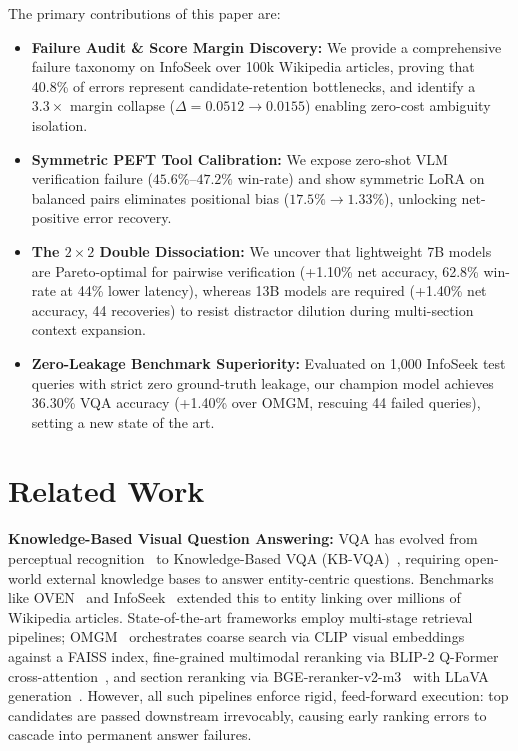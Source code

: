 \documentclass[conference]{IEEEtran}
\begin{document}
The primary contributions of this paper are:
\begin{itemize}
    \item \textbf{Failure Audit \& Score Margin Discovery:} We provide a comprehensive failure taxonomy on InfoSeek over 100k Wikipedia articles, proving that 40.8\% of errors represent candidate-retention bottlenecks, and identify a $3.3\times$ margin collapse ($\Delta = 0.0512 \to 0.0155$) enabling zero-cost ambiguity isolation.
    \item \textbf{Symmetric PEFT Tool Calibration:} We expose zero-shot VLM verification failure ($45.6\%$--$47.2\%$ win-rate) and show symmetric LoRA on balanced pairs eliminates positional bias ($17.5\% \to 1.33\%$), unlocking net-positive error recovery.
    \item \textbf{The \texorpdfstring{$2 \times 2$}{2x2} Double Dissociation:} We uncover that lightweight 7B models are Pareto-optimal for pairwise verification (+1.10\% net accuracy, 62.8\% win-rate at 44\% lower latency), whereas 13B models are required (+1.40\% net accuracy, 44 recoveries) to resist distractor dilution during multi-section context expansion.
    \item \textbf{Zero-Leakage Benchmark Superiority:} Evaluated on 1,000 InfoSeek test queries with strict zero ground-truth leakage, our champion model achieves 36.30\% VQA accuracy (+1.40\% over OMGM, rescuing 44 failed queries), setting a new state of the art.
\end{itemize}


\section{Related Work}

\textbf{Knowledge-Based Visual Question Answering:} VQA has evolved from perceptual recognition~\cite{vqa_v2} to Knowledge-Based VQA (KB-VQA)~\cite{okvqa, aokvqa}, requiring open-world external knowledge bases to answer entity-centric questions. Benchmarks like OVEN~\cite{oven} and InfoSeek~\cite{infoseek} extended this to entity linking over millions of Wikipedia articles. State-of-the-art frameworks employ multi-stage retrieval pipelines; OMGM~\cite{omgm2025} orchestrates coarse search via CLIP visual embeddings~\cite{clip} against a FAISS index, fine-grained multimodal reranking via BLIP-2 Q-Former cross-attention~\cite{blip2}, and section reranking via BGE-reranker-v2-m3~\cite{bge_reranker} with LLaVA generation~\cite{llava15}. However, all such pipelines enforce rigid, feed-forward execution: top candidates are passed downstream irrevocably, causing early ranking errors to cascade into permanent answer failures.
\end{document}

